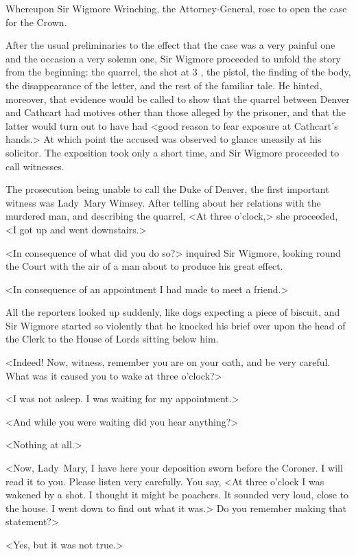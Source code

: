 Whereupon Sir Wigmore Wrinching, the Attorney-General, rose to open the case for the Crown.

After the usual preliminaries to the effect that the case was a very painful one and the occasion a very solemn one, Sir Wigmore proceeded to unfold the story from the beginning: the quarrel, the shot at 3 , the pistol, the finding of the body, the disappearance of the letter, and the rest of the familiar tale. He hinted, moreover, that evidence would be called to show that the quarrel between Denver and Cathcart had motives other than those alleged by the prisoner, and that the latter would turn out to have had <good reason to fear exposure at Cathcart's hands.> At which point the accused was observed to glance uneasily at his solicitor. The exposition took only a short time, and Sir Wigmore proceeded to call witnesses.

The prosecution being unable to call the Duke of Denver, the first important witness was Lady~Mary Wimsey. After telling about her relations with the murdered man, and describing the quarrel, <At three o'clock,> she proceeded, <I got up and went downstairs.>

<In consequence of what did you do so?> inquired Sir Wigmore, looking round the Court with the air of a man about to produce his great effect.

<In consequence of an appointment I had made to meet a friend.>

All the reporters looked up suddenly, like dogs expecting a piece of biscuit, and Sir Wigmore started so violently that he knocked his brief over upon the head of the Clerk to the House of Lords sitting below him.

<Indeed! Now, witness, remember you are on your oath, and be very careful. What was it caused you to wake at three o'clock?>

<I was not asleep. I was waiting for my appointment.>

<And while you were waiting did you hear anything?>

<Nothing at all.>

<Now, Lady~Mary, I have here your deposition sworn before the Coroner.  I will read it to you. Please listen very carefully. You say, <At three o'clock I was wakened by a shot. I thought it might be poachers. It sounded very loud, close to the house. I went down to find out what it was.> Do you remember making that statement?>

<Yes, but it was not true.>

